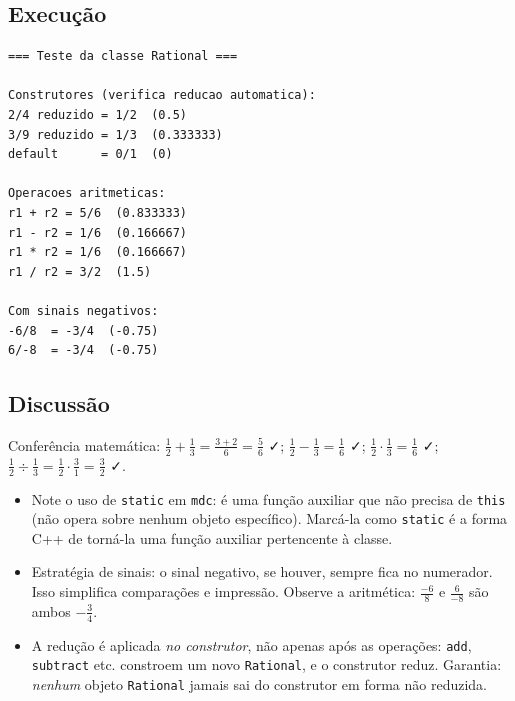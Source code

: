 \documentclass[11pt,a4paper]{article}
\begin{document}


\subsection*{Execu\c{c}\~ao}

\begin{saidabox}
\begin{lstlisting}[style=terminal]
=== Teste da classe Rational ===

Construtores (verifica reducao automatica):
2/4 reduzido = 1/2  (0.5)
3/9 reduzido = 1/3  (0.333333)
default      = 0/1  (0)

Operacoes aritmeticas:
r1 + r2 = 5/6  (0.833333)
r1 - r2 = 1/6  (0.166667)
r1 * r2 = 1/6  (0.166667)
r1 / r2 = 3/2  (1.5)

Com sinais negativos:
-6/8  = -3/4  (-0.75)
6/-8  = -3/4  (-0.75)
\end{lstlisting}
\end{saidabox}

\subsection*{Discuss\~ao}

Confer\^encia matem\'atica: $\tfrac{1}{2}+\tfrac{1}{3} = \tfrac{3+2}{6} = \tfrac{5}{6}$ ✓; $\tfrac{1}{2}-\tfrac{1}{3} = \tfrac{1}{6}$ ✓; $\tfrac{1}{2}\cdot\tfrac{1}{3} = \tfrac{1}{6}$ ✓; $\tfrac{1}{2}\div\tfrac{1}{3} = \tfrac{1}{2}\cdot\tfrac{3}{1} = \tfrac{3}{2}$ ✓.

\begin{itemize}[leftmargin=*]
  \item Note o uso de \texttt{static} em \texttt{mdc}: \'e uma fun\c{c}\~ao auxiliar que n\~ao precisa de \texttt{this} (n\~ao opera sobre nenhum objeto espec\'ifico). Marc\'a-la como \texttt{static} \'e a forma C++ de torn\'a-la uma fun\c{c}\~ao auxiliar pertencente \`a classe.
  \item Estrat\'egia de sinais: o sinal negativo, se houver, sempre fica no numerador. Isso simplifica compara\c{c}\~oes e impress\~ao. Observe a aritm\'etica: $\tfrac{-6}{8}$ e $\tfrac{6}{-8}$ s\~ao ambos $-\tfrac{3}{4}$.
  \item A redu\c{c}\~ao \'e aplicada \emph{no construtor}, n\~ao apenas ap\'os as opera\c{c}\~oes: \texttt{add}, \texttt{subtract} etc. constroem um novo \texttt{Rational}, e o construtor reduz. Garantia: \emph{nenhum} objeto \texttt{Rational} jamais sai do construtor em forma n\~ao reduzida.
\end{itemize}
\end{document}
